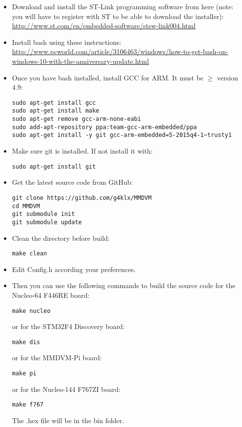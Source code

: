 \documentclass[]{article}
\begin{document}
\begin{itemize}[leftmargin=*]
	
\item Download and install the ST-Link programming software from here (note: you will have to register with ST to be able to download the installer): \url{http://www.st.com/en/embedded-software/stsw-link004.html}

\item Install bash using these instructions: \url{http://www.pcworld.com/article/3106463/windows/how-to-get-bash-on-windows-10-with-the-anniversary-update.html}

\item Once you have bash installed, install GCC for ARM. It must be $\geq$ version 4.9:
\begin{lstlisting}[style=DOS]
sudo apt-get install gcc
sudo apt-get install make
sudo apt-get remove gcc-arm-none-eabi
sudo add-apt-repository ppa:team-gcc-arm-embedded/ppa
sudo apt-get install -y git gcc-arm-embedded=5-2015q4-1~trusty1
\end{lstlisting}

\item Make sure git is installed. If not install it with:
\begin{lstlisting}[style=DOS]
sudo apt-get install git
\end{lstlisting}

\item Get the latest source code from GitHub:
\begin{lstlisting}[style=DOS]
git clone https://github.com/g4klx/MMDVM
cd MMDVM
git submodule init
git submodule update
\end{lstlisting}

\item Clean the directory before build:
\begin{lstlisting}[style=DOS]
make clean
\end{lstlisting}

\item Edit Config.h according your preferences.

\item Then you can use the following commands to build the source code for the Nucleo-64 F446RE board:
\begin{lstlisting}[style=DOS]
make nucleo
\end{lstlisting}

or for the STM32F4 Discovery board:
\begin{lstlisting}[style=DOS]
make dis
\end{lstlisting}

or for the MMDVM-Pi board:
\begin{lstlisting}[style=DOS]
make pi
\end{lstlisting}

or for the Nucleo-144 F767ZI board:
\begin{lstlisting}[style=DOS]
make f767
\end{lstlisting}

The .hex file will be in the bin folder.

\end{itemize}
\end{document}
